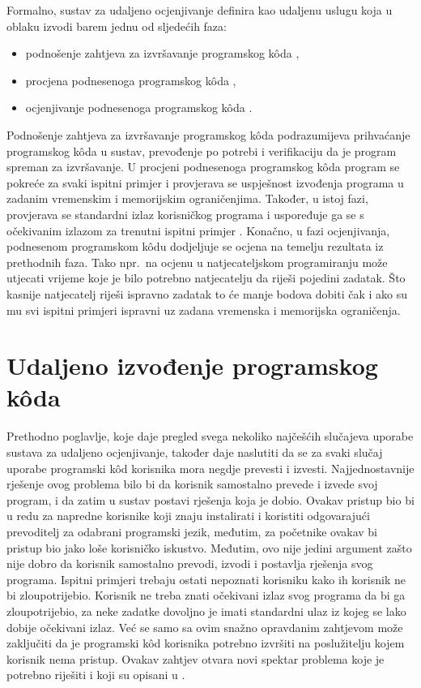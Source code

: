 \documentclass[times, utf8, diplomski]{fer}
\begin{document}
Formalno, sustav za udaljeno ocjenjivanje \citep{wasik2018survey} definira kao udaljenu uslugu  koja u oblaku  izvodi barem jednu od sljedećih faza:
\begin{itemize}
    \item podnošenje zahtjeva za izvršavanje programskog kôda ,
    \item procjena podnesenoga programskog kôda ,
    \item ocjenjivanje podnesenoga programskog kôda .
\end{itemize}

Podnošenje zahtjeva za izvršavanje programskog kôda podrazumijeva prihvaćanje programskog kôda u sustav, prevođenje po potrebi i verifikaciju da je program spreman za izvršavanje. U procjeni podnesenoga programskog kôda program se pokreće za svaki ispitni primjer i provjerava se uspješnost izvođenja programa u zadanim vremenskim i memorijskim ograničenjima. Također, u istoj fazi, provjerava se standardni izlaz  korisničkog programa i uspoređuje ga se s očekivanim izlazom za trenutni ispitni primjer . Konačno, u fazi ocjenjivanja, podnesenom programskom kôdu dodjeljuje se ocjena na temelju rezultata iz prethodnih faza. Tako npr.\ na ocjenu u natjecateljskom programiranju može utjecati vrijeme koje je bilo potrebno natjecatelju da riješi pojedini zadatak. Što kasnije natjecatelj riješi ispravno zadatak to će manje bodova dobiti čak i ako su mu svi ispitni primjeri ispravni uz zadana vremenska i memorijska ograničenja.

\section{Udaljeno izvođenje programskog kôda}
Prethodno poglavlje, koje daje pregled svega nekoliko najčešćih slučajeva uporabe sustava za udaljeno ocjenjivanje, također daje naslutiti da se za svaki slučaj uporabe programski kôd korisnika mora negdje prevesti i izvesti. Najjednostavnije rješenje ovog problema bilo bi da korisnik samostalno prevede i izvede svoj program, i da zatim u sustav postavi rješenja koja je dobio. Ovakav pristup bio bi u redu za napredne korisnike koji znaju instalirati i koristiti odgovarajući prevoditelj za odabrani programski jezik, međutim, za početnike ovakav bi pristup bio jako loše korisničko iskustvo. Međutim, ovo nije jedini argument zašto nije dobro da korisnik samostalno prevodi, izvodi i postavlja rješenja svog programa. Ispitni primjeri trebaju ostati nepoznati korisniku kako ih korisnik ne bi zloupotrijebio. Korisnik ne treba znati očekivani izlaz svog programa da bi ga zloupotrijebio, za neke zadatke dovoljno je imati standardni ulaz  iz kojeg se lako dobije očekivani izlaz. Već se samo sa ovim snažno opravdanim zahtjevom može zaključiti da je programski kôd korisnika potrebno izvršiti na poslužitelju kojem korisnik nema pristup. Ovakav zahtjev otvara novi spektar problema koje je potrebno riješiti i koji su opisani u \citep{kurnia2001online}.
\end{document}
